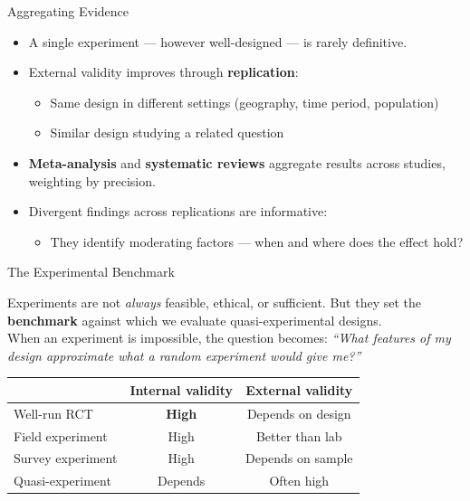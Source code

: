 \documentclass[aspectratio=169, 11pt]{beamer}
\begin{document}
\begin{frame}[t]{Aggregating Evidence}
\begin{itemize}
  \setlength\itemsep{0.5em}
  \item A single experiment — however well-designed — is rarely definitive.
  \item External validity improves through \textbf{replication}:
    \begin{itemize}
      \item Same design in different settings (geography, time period, population)
      \item Similar design studying a related question
    \end{itemize}
  \item \textbf{Meta-analysis} and \textbf{systematic reviews} aggregate results
        across studies, weighting by precision.
  \item Divergent findings across replications are informative:
    \begin{itemize}
      \item They identify moderating factors — when and where does the effect hold?
    \end{itemize}
\end{itemize}
\vspace{0.3em}
\end{frame}

\begin{frame}[t]{The Experimental Benchmark}
\begin{keybox}
  Experiments are not \emph{always} feasible, ethical, or sufficient.
  But they set the \textbf{benchmark} against which we evaluate
  quasi-experimental designs.\\[0.5em]
  When an experiment is impossible, the question becomes:
  \emph{``What features of my design approximate what a random experiment would give me?''}
\end{keybox}
\vspace{0.5em}
\begin{center}
\small
\begin{tabular}{lcc}
\toprule
& \textbf{Internal validity} & \textbf{External validity} \\
\midrule
Well-run RCT & \textcolor{okabegreen}{\textbf{High}} & Depends on design \\
Field experiment & High & Better than lab \\
Survey experiment & High & Depends on sample \\
Quasi-experiment & Depends & Often high \\
\bottomrule
\end{tabular}
\end{center}
\end{frame}
\end{document}
